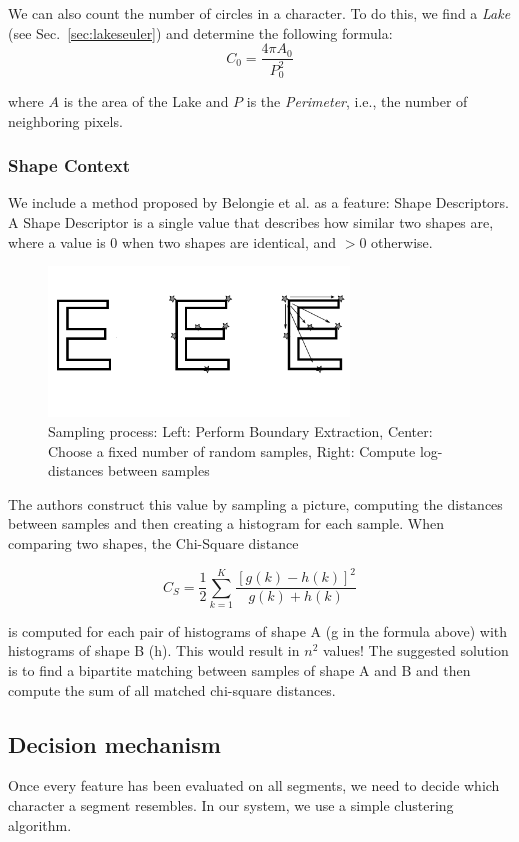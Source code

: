 \documentclass{article}
\begin{document}
We can also count the number of circles in a character. To do this, we find a \textit{Lake} (see Sec.~\ref{sec:lakeseuler}) and determine the following formula:
\begin{equation}
C_0 = \frac{4\pi A_0}{P_0^2}
\end{equation}

where $A$ is the area of the Lake and $P$ is the \textit{Perimeter}, i.e., the number of neighboring pixels.

\subsubsection{Shape Context}
We include a method proposed by Belongie et al. \cite{Belongie00shapecontext:} as a feature: Shape Descriptors. A Shape Descriptor is a single value that describes how similar two shapes are, where a value is 0 when two shapes are identical, and $>0$ otherwise. 

\begin{figure}
 \centering
 \includegraphics[width=8cm]{images/samples.png}
 \caption{Sampling process: Left: Perform Boundary Extraction, Center: Choose a fixed number of random samples, Right: Compute log-distances between samples}
\end{figure}

The authors construct this value by sampling a picture, computing the distances between samples and then creating a histogram for each sample. When comparing two shapes, the Chi-Square distance 

\begin{displaymath}
C_S = \frac{1}{2} \sum\limits^K_{k=1} \frac{\left[g(k) - h(k)\right]^2}{g(k)+h(k)}
\end{displaymath}


is computed for each pair of histograms of shape A (g in the formula above) with histograms of shape B (h). This would result in $n^2$ values! The suggested solution is to find a bipartite matching between samples of shape A and B and then compute the sum of all matched chi-square distances.

\subsection{Decision mechanism}
Once every feature has been evaluated on all segments, we need to decide which character a segment resembles. In our system, we use a simple clustering algorithm.
\end{document}
